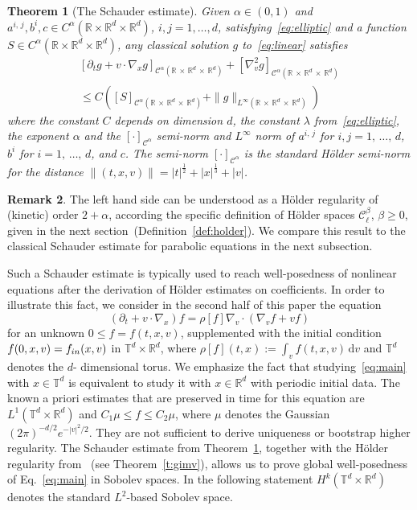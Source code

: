 \documentclass[10pt]{amsart}
\newtheorem{theo}{Theorem}[section]
\theoremstyle{definition}\newtheorem{defi}[theo]{Definition}\newtheorem{rema}[theo]{Remark}\newtheorem{exam}[theo]{Example}\newtheorem{exem}[theo]{Example}\newtheorem{nota}[theo]{Notation}
\newcommand{\R}{\mathbb{R}}
\newcommand{\T}{\mathbb{T}}
\newcommand{\cC}{\mathcal{C}}
\newcommand{\dd}{{\, \mathrm d}}
\begin{document}
\begin{theo}[The Schauder estimate]\label{thm:variable}
Given $\alpha \in (0,1)$ and $a^{i,\,j},b^i,c \in C^\alpha(\R \times \R^d \times \R^d)$, $i,j=1,\dots,d$, satisfying~\eqref{eq:elliptic} and a function $S \in C^\alpha(\R \times \R^d \times \R^d)$, any classical solution $g$ to~\eqref{eq:linear} satisfies
\begin{multline}\label{eq:schauder-main}
\left[\partial_t g + v \cdot \nabla_x g
\right]_{\cC^\alpha\left(\R\,\times\,\R^d\,\times\,\R^d\right)} + \left[\nabla_v ^2 g
\right]_{\cC^\alpha\left(\R\,\times\,\R^d\,\times\,\R^d\right)}\\
\le C \left([S]_{\cC^\alpha\left(\R\,\times\,\R^d\,\times\,\R^d\right)} +
\|g\|_{L^\infty\left(\R\,\times\,\R^d\,\times\,\R^d\right)}\right)
\end{multline}
where the constant $C$ depends on dimension $d$, the constant $\lambda$ from~\eqref{eq:elliptic}, the exponent $\alpha$ and the $[\cdot]_{\cC^\alpha}$ semi-norm and $L^\infty$ norm of $a^{i,\,j}$ for $i,j=1,\,\dots,\,d$, $b^i$ for $i=1,\,\dots,\,d$, and $c$. The semi-norm $[\cdot]_{\cC^\alpha}$ is the standard H\"older semi-norm for the distance $\|(t,x,v)\|=|t|^{\frac12} + |x|^{\frac13} +|v|$.
\end{theo}

\begin{rema}
The left hand side can be understood as a H\"older regularity of (kinetic) order $2+\alpha$, according the specific definition of H\"older spaces $\cC_\ell^\beta$, $\beta \ge 0$, given in the next section~(Definition~\ref{def:holder}). We compare this result to the classical Schauder estimate for parabolic equations in the next subsection.
\end{rema}

Such a Schauder estimate is typically used to reach well-posedness of nonlinear equations after the derivation of H\"older estimates on coefficients. In order to illustrate this fact, we consider in the second half of this paper the equation
\begin{equation}\label{eq:main}
\left(\partial_t + v \cdot \nabla_x\right) f = \rho[f] \nabla_v \cdot \left(\nabla_v f + v f \right)
\end{equation}
for an unknown $0 \le f =f(t,x,v)$, supplemented with the initial condition $f (0,x,v)\linebreak=f_{in}(x,v)$ in $\T^d \times \R^d$, where $\rho[f] (t,x):= \int_v f(t,x,v) \dd v$ and $\T^d$ denotes the $d$- dimensional torus. We emphasize the fact that studying~\eqref{eq:main} with $x \in \T^d$ is equivalent to study it with $x \in \R^d$ with periodic initial data. The known a priori estimates that are preserved in time for this equation are $L^1(\T^d \times \R^d)$ and $C_1 \mu \le f \le C_2 \mu$, where $\mu$ denotes the Gaussian $(2\pi)^{-d/2} e^{-|v|^2/2}$. They are not sufficient to derive uniqueness or bootstrap higher regularity. The Schauder estimate from Theorem~\ref{thm:variable}, together with the H\"older regularity from~\cite{gimv} (see Theorem~\ref{t:gimv}), allows us to prove global well-posedness of Eq.~\eqref{eq:main} in Sobolev spaces. In the following statement $H^k(\T^d \times \R^d)$ denotes the standard $L^2$-based Sobolev space.
\end{document}
